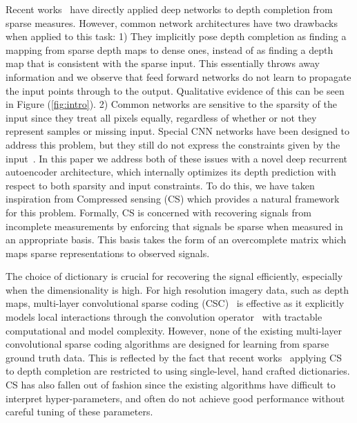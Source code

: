 Recent works~\cite{} have directly applied deep networks to depth completion from sparse measures. However, common network architectures have two drawbacks when applied to this task: 1) They implicitly pose depth completion as finding a mapping from sparse depth maps to dense ones, instead of as finding a depth map that is consistent with the sparse input. This essentially throws away information and we observe that feed forward networks do not learn to propagate the input points through to the output. Qualitative evidence of this can be seen in Figure (\ref{fig:intro}). 2) Common networks are sensitive to the sparsity of the input since they treat all pixels equally, regardless of whether or not they represent samples or missing input. Special CNN networks have been designed to address this problem, but they still do not express the constraints given by the input~\cite{}. In this paper we address both of these issues with a novel deep recurrent autoencoder architecture, which internally optimizes its depth prediction with respect to both sparsity and input constraints.
To do this, we have taken inspiration from Compressed sensing (CS) which provides a natural framework for this problem. Formally, CS is concerned with recovering signals from incomplete measurements by enforcing that signals be sparse when measured in an appropriate basis. This basis takes the form of an overcomplete matrix which maps sparse representations to observed signals.

The choice of dictionary is crucial for recovering the signal efficiently, especially when the dimensionality is high. For high resolution imagery data, such as depth maps, multi-layer convolutional sparse coding (CSC)~\cite{} is effective as it explicitly models local interactions through the convolution operator~\cite{} with tractable computational and model complexity. However, none of the existing multi-layer convolutional sparse coding algorithms are designed for learning from sparse ground truth data. This is reflected by the fact that recent works~\cite{} applying CS to depth completion are restricted to using single-level, hand crafted dictionaries. CS has also fallen out of fashion since the existing algorithms have difficult to interpret hyper-parameters, and often do not achieve good performance without careful tuning of these parameters.

